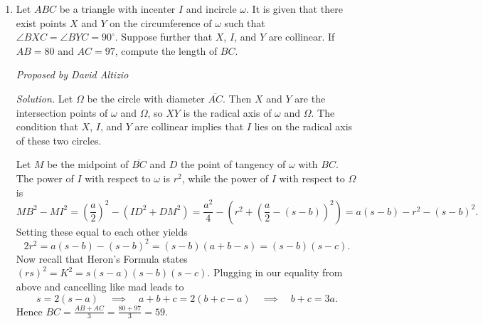 \documentclass[10pt]{article}
\newcommand{\proposed}[1]
{
\vspace{5pt}
\noindent\textit{Proposed by #1}
}
\newcommand{\solution}
{
\vspace{5pt}
\noindent\textit{Solution.}\qquad
}
\newcounter{enum}
\begin{document}
\begin{enumerate}
\begin{figure}[ht]
	\centering
	\begin{asy}
import olympiad;
size(250);
defaultpen(linewidth(0.8));
pair A = dir(70), B = origin, C = (1.5, 0), D = A + C, P = orthocenter(A,B,C), X = foot(A,B,C), Y = foot(C,B,A);
draw(A--B--C--D--A--X^^C--Y^^B--P--D);
draw(circumcircle(A,D,C),linetype("4 4"));
draw(rightanglemark(A,X,C,2)^^rightanglemark(B,Y,C,2));
label("$A$",A,NW);
label("$B$",B,SW);
label("$C$",C,SE);
label("$D$",D,NE);
label("$P$",P,2*dir(55));
\end{asy}
\end{figure}

\par Now I claim that $PB=2R\cos B$.  To prove this, reflect $P$ across $AB$ to point $P'$.  It is well-known that $P'$ lies on the circumcircle of $\triangle ABC$, so in particular the circumradii of $\triangle APB$ and $\triangle ACB$ are equal.  But then by Law of Sines \[\dfrac{BP}{\sin\angle BAP}=\dfrac{BP}{\cos B}=2R\quad\implies\quad BP = 2R\cos B\] as desired.  (An alternate way to see this is through the diagram itself: from right triangle trigonometry on triangles $DAP$ and $DCP$ it is not hard to see that $PA=2R\cos A$ and $PC=2R\cos C$, which by symmetry suggests $PB=2R\cos B$.)

\par Finally, note that by Law of Sines again we have $AC=2R\sin B$, so \[AC^2+BP^2=(2R\sin B)^2 + (2R\cos B)^2 = (2R)^2(\sin^2 B+\cos^2 B) = PD^2.\] Hence \[AC^2=PD^2-PB^2=821^2-700^2=(821-700)(821+700)=11^2\cdot 39^2\] and so $AC=11\cdot 39=\boxed{429}$.

\item Let $ABC$ be a triangle with incenter $I$ and incircle $\omega$.  It is given that there exist points $X$ and $Y$ on the circumference of $\omega$ such that $\angle BXC=\angle BYC=90^\circ$.  Suppose further that $X$, $I$, and $Y$ are collinear.  If $AB=80$ and $AC=97$, compute the length of $BC$.

\proposed{David Altizio}

\solution Let $\Omega$ be the circle with diameter $\overline{AC}$.  Then $X$ and $Y$ are the intersection points of $\omega$ and $\Omega$, so $XY$ is the radical axis of $\omega$ and $\Omega$.  The condition that $X$, $I$, and $Y$ are collinear implies that $I$ lies on the radical axis of these two circles.

\par Let $M$ be the midpoint of $\overline{BC}$ and $D$ the point of tangency of $\omega$ with $BC$.  The power of $I$ with respect to $\omega$ is $r^2$, while the power of $I$ with respect to $\Omega$ is \[MB^2-MI^2=\left(\frac a2\right)^2 - (ID^2+DM^2) = \frac{a^2}4-\left(r^2+\left(\frac a2 - (s-b)\right)^2\right)=a(s-b)-r^2-(s-b)^2.\] Setting these equal to each other yields \[2r^2 = a(s-b)-(s-b)^2 = (s-b)(a+b-s)=(s-b)(s-c).\] Now recall that Heron's Formula states $(rs)^2 = K^2 = s(s-a)(s-b)(s-c)$.  Plugging in our equality from above and cancelling like mad leads to \[s=2(s-a)\quad\implies\quad a+b+c=2(b+c-a)\quad\implies\quad b+c=3a.\] Hence $BC=\tfrac{AB+AC}3=\tfrac{80+97}3=\boxed{59}$.


\end{enumerate}
\end{document}
